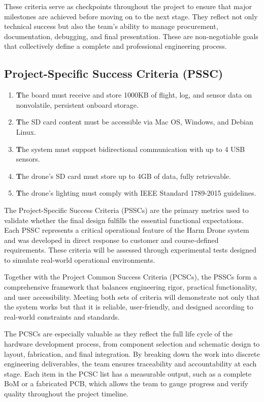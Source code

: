 \documentclass[12pt]{article}
\begin{document}
These criteria serve as checkpoints throughout the project to ensure that major milestones are achieved before moving on to the next stage. They reflect not only technical success but also the team’s ability to manage procurement, documentation, debugging, and final presentation. These are non-negotiable goals that collectively define a complete and professional engineering process.

\subsection{Project-Specific Success Criteria (PSSC)}

\begin{enumerate}

    \item \textbf The board must receive and store 1000KB of flight, log, and sensor data on nonvolatile, persistent onboard storage.
    \item \textbf The SD card content must be accessible via Mac OS, Windows, and Debian Linux.
    \item \textbf The system must support bidirectional communication with up to 4 USB sensors.
    \item \textbf The drone's SD card must store up to 4GB of data, fully retrievable.
    \item \textbf The drone’s lighting must comply with IEEE Standard 1789-2015 guidelines.
\end{enumerate}

The Project-Specific Success Criteria (PSSCs) are the primary metrics used to validate whether the final design fulfills the essential functional expectations. Each PSSC represents a critical operational feature of the Harm Drone system and was developed in direct response to customer and course-defined requirements. These criteria will be assessed through experimental tests designed to simulate real-world operational environments. 

Together with the Project Common Success Criteria (PCSCs), the PSSCs form a comprehensive framework that balances engineering rigor, practical functionality, and user accessibility. Meeting both sets of criteria will demonstrate not only that the system works but that it is reliable, user-friendly, and designed according to real-world constraints and standards.

The PCSCs are especially valuable as they reflect the full life cycle of the hardware development process, from component selection and schematic design to layout, fabrication, and final integration. By breaking down the work into discrete engineering deliverables, the team ensures traceability and accountability at each stage. Each item in the PCSC list has a measurable output, such as a complete BoM or a fabricated PCB, which allows the team to gauge progress and verify quality throughout the project timeline.
\end{document}
